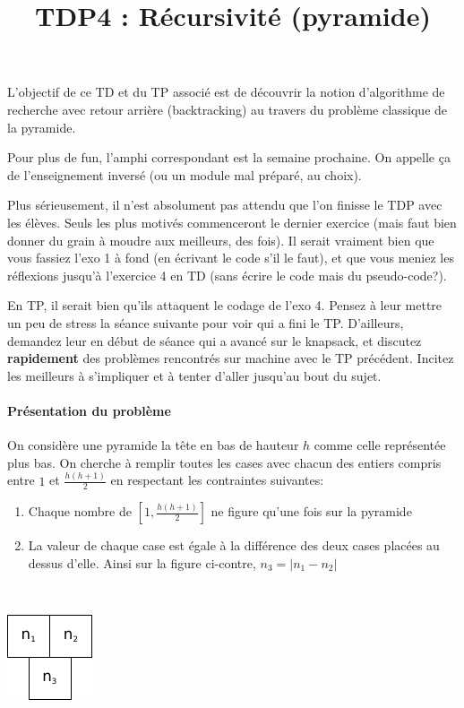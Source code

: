 \documentclass[10pt]{article}\usepackage[correction,nu]{esial}
\begin{document}
\color{black}
\title{TDP4 : Récursivité (pyramide)}
\maketitle

L'objectif de ce TD et du TP associé est de découvrir la notion d'algorithme de
recherche avec retour arrière (backtracking) au travers du problème classique de
la pyramide.

\begin{Reponse}
  Pour plus de fun, l'amphi correspondant est la semaine prochaine. On appelle
  ça de l'enseignement inversé (ou un module mal préparé, au choix).

  Plus sérieusement, il n'est absolument pas attendu que l'on finisse le TDP
  avec les élèves. Seuls les plus motivés commenceront le dernier exercice (mais
  faut bien donner du grain à moudre aux meilleurs, des fois). Il serait
  vraiment bien que vous fassiez l'exo 1 à fond (en écrivant le code s'il le
  faut), et que vous meniez les réflexions jusqu'à l'exercice 4 en TD (sans
  écrire le code mais du pseudo-code?).

  En TP, il serait bien qu'ils attaquent le codage de l'exo 4. Pensez à leur
  mettre un peu de stress la séance suivante pour voir qui a fini le
  TP. D'ailleurs, demandez leur en début de séance qui a avancé sur le knapsack,
  et discutez \textbf{rapidement} des problèmes rencontrés sur machine avec le
  TP précédent. Incitez les meilleurs à s'impliquer et à tenter d'aller jusqu'au
  bout du sujet.
\end{Reponse}


\paragraph{Présentation du problème}

On considère une pyramide la tête en bas de hauteur $h$ comme celle
représentée plus bas. On cherche à remplir toutes les cases avec chacun des
entiers compris entre $1$ et $\frac{h(h+1)}{2}$ en respectant les contraintes
suivantes:

\begin{minipage}{.8\linewidth}
\begin{enumerate}
\item Chaque nombre de $\left[1,\frac{h(h+1)}{2}\right]$ ne figure qu'une fois sur la pyramide
\item La valeur de chaque case est égale à la différence des deux cases placées
  au dessus d'elle.
  Ainsi sur la figure ci-contre, $n_3=|n_1 - n_2|$
\end{enumerate}  
\end{minipage}~\begin{minipage}{.2\linewidth}
  \centering
  \includegraphics{img/pyramide3.pdf} 
\end{minipage}
\end{document}
